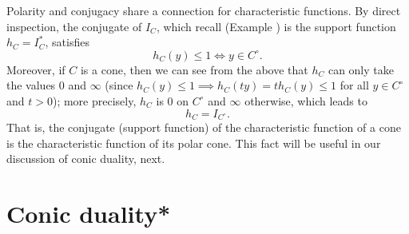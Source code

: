 Polarity and conjugacy share a connection for characteristic functions. By
direct inspection, the conjugate of $I_C$, which recall (Example
) is the support function $h_C = I^*_C$,
satisfies        
\[
h_C(y) \leq 1 \iff y \in C^\circ.
\]
Moreover, if $C$ is a cone, then we can see from the above that $h_C$ can
only take the values 0 and $\infty$ (since $h_C(y) \leq 1 \implies h_C(ty) = t
h_C(y) \leq 1$ for all $y \in C^\circ$ and $t>0$); more precisely, $h_C$ is 0 
on $C^\circ$ and $\infty$ otherwise, which leads to 
\begin{equation}
\label{eq:support_function_cone}
h_C = I_{C^\circ}.
\end{equation}
That is, the conjugate (support function) of the characteristic function of a
cone is the characteristic function of its polar cone. This fact will be useful
in our discussion of conic duality, next.  
  


\section{Conic duality*}
\label{sec:conic_duality}

